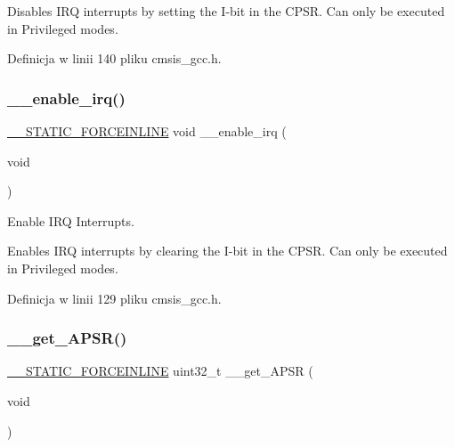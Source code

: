 Disables I\+RQ interrupts by setting the I-\/bit in the C\+P\+SR. Can only be executed in Privileged modes. 

Definicja w linii 140 pliku cmsis\+\_\+gcc.\+h.

\mbox{\label{group___c_m_s_i_s___core___reg_acc_functions_gae84bf4e95944e61937f4ed2453e5ef23}} 
\subsubsection{\texorpdfstring{\+\_\+\+\_\+enable\+\_\+irq()}{\_\_enable\_irq()}}
{\footnotesize\ttfamily \hyperlink{cmsis__iccarm_8h_ab904513442afdf77d4f8c74f23cbb040}{\+\_\+\+\_\+\+S\+T\+A\+T\+I\+C\+\_\+\+F\+O\+R\+C\+E\+I\+N\+L\+I\+NE} void \+\_\+\+\_\+enable\+\_\+irq (\begin{DoxyParamCaption}\item[{void}]{ }\end{DoxyParamCaption})}



Enable I\+RQ Interrupts. 

Enables I\+RQ interrupts by clearing the I-\/bit in the C\+P\+SR. Can only be executed in Privileged modes. 

Definicja w linii 129 pliku cmsis\+\_\+gcc.\+h.

\mbox{\label{group___c_m_s_i_s___core___reg_acc_functions_gadff4f1e599946e8ae96fba17b5245f04}} 
\subsubsection{\texorpdfstring{\+\_\+\+\_\+get\+\_\+\+A\+P\+S\+R()}{\_\_get\_APSR()}}
{\footnotesize\ttfamily \hyperlink{cmsis__iccarm_8h_ab904513442afdf77d4f8c74f23cbb040}{\+\_\+\+\_\+\+S\+T\+A\+T\+I\+C\+\_\+\+F\+O\+R\+C\+E\+I\+N\+L\+I\+NE} uint32\+\_\+t \+\_\+\+\_\+get\+\_\+\+A\+P\+SR (\begin{DoxyParamCaption}\item[{void}]{ }\end{DoxyParamCaption})}



